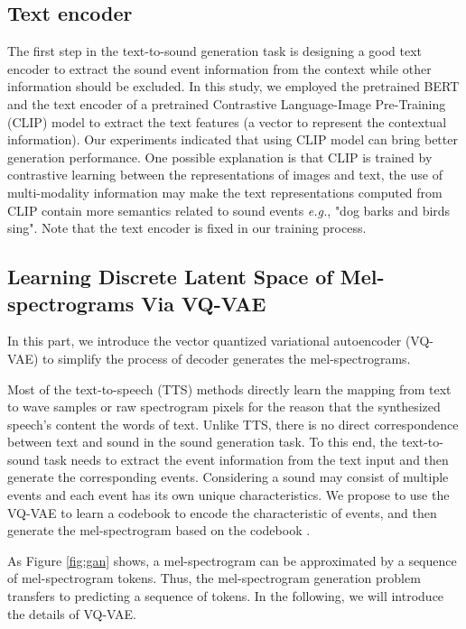 \documentclass[lettersize,journal]{IEEEtran}
\begin{document}
\subsection{Text encoder} \label{text encoder}
The first step in the text-to-sound generation task is designing a good text encoder to extract the sound event information from the context while other information should be excluded. In this study, we employed the pretrained BERT \cite{devlin2018bert} and the text encoder of a pretrained Contrastive Language-Image Pre-Training (CLIP) model \cite{radford2021learning} to extract the text features (a vector to represent the contextual information). Our experiments indicated that using CLIP model can bring better generation performance. {\color{black} One possible explanation is that CLIP is trained by contrastive learning between the representations of images and text, the use of multi-modality information may make the text representations computed from CLIP contain more semantics related to sound events \textit{e.g.}, "dog barks and birds sing".}  Note that the text encoder is fixed in our training process.
\subsection{Learning Discrete Latent Space of Mel-spectrograms Via VQ-VAE} \label{sec:vqvae}
In this part, we introduce the vector quantized variational autoencoder (VQ-VAE) \cite{van2017neural} to simplify the process of decoder generates the mel-spectrograms. 

Most of the text-to-speech (TTS) methods \cite{tan2021survey,kong2020diffwave,jeong2021diff} directly learn the mapping from text to wave samples or raw spectrogram pixels for the reason that the synthesized speech's content {\color{black}{relies on}} the words of text. Unlike TTS, there is no direct correspondence between text and sound in the sound generation task. To this end, the text-to-sound task needs to extract the event information from the text input and then generate the corresponding events. Considering a sound may consist of multiple events and each event has its own unique characteristics. We propose to use the VQ-VAE to learn a codebook to encode the characteristic of events, and then generate the mel-spectrogram based on the codebook {}. 


As Figure \ref{fig:gan} shows, a mel-spectrogram can be approximated by a sequence of mel-spectrogram tokens. Thus, the mel-spectrogram generation problem transfers to predicting a sequence of tokens. In the following, we will introduce the details of VQ-VAE.
\end{document}
